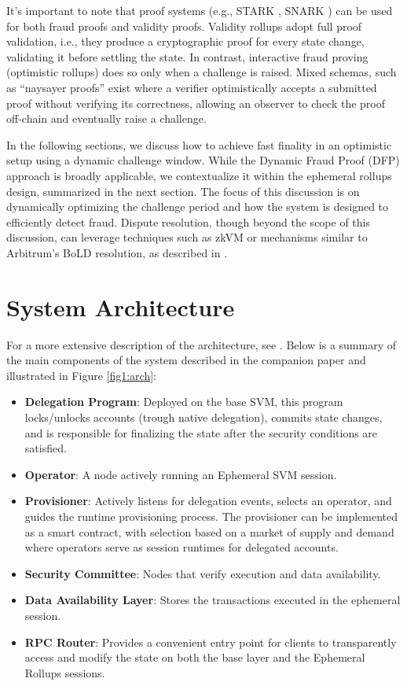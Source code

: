 \documentclass{article}
\begin{document}
It’s important to note that proof systems (e.g., STARK \cite{BenSasson2018ScalableTA}, SNARK \cite{chen2022review}) can be used for both fraud proofs and validity proofs. Validity rollups adopt full proof validation, i.e., they produce a cryptographic proof for every state change, validating it before settling the state. In contrast, interactive fraud proving (optimistic rollups) does so only when a challenge is raised. Mixed schemas, such as “naysayer proofs” \cite{cryptoeprint:2023/1472} exist where a verifier optimistically accepts a submitted proof without verifying its correctness, allowing an observer to check the proof off-chain and eventually raise a challenge.

In the following sections, we discuss how to achieve fast finality in an optimistic setup using a dynamic challenge window. While the Dynamic Fraud Proof (DFP) approach is broadly applicable, we contextualize it within the ephemeral rollups design, summarized in the next section. The focus of this discussion is on dynamically optimizing the challenge period and how the system is designed to efficiently detect fraud. Dispute resolution, though beyond the scope of this discussion, can leverage techniques such as zkVM or mechanisms similar to Arbitrum’s BoLD resolution, as described in \cite{alvarez2024boldfastcheapdispute}.

\section{System Architecture}

For a more extensive description of the architecture, see \cite{picco2023ephemeral}. Below is a summary of the main components of the system described in the companion paper and illustrated in Figure \ref{fig1:arch}:

\begin{itemize}
    \item \textbf{Delegation Program}: Deployed on the base SVM, this program locks/unlocks accounts (trough native delegation), commits state changes, and is responsible for finalizing the state after the security conditions are satisfied.
    \item \textbf{Operator}: A node actively running an Ephemeral SVM session.
    \item \textbf{Provisioner}: Actively listens for delegation events, selects an operator, and guides the runtime provisioning process. The provisioner can be implemented as a smart contract, with selection based on a market of supply and demand where operators serve as session runtimes for delegated accounts.
    \item \textbf{Security Committee}: Nodes that verify execution and data availability.
    \item \textbf{Data Availability Layer}: Stores the transactions executed in the ephemeral session.
    \item \textbf{RPC Router}: Provides a convenient entry point for clients to transparently access and modify the state on both the base layer and the Ephemeral Rollups sessions.
\end{itemize}
\end{document}
